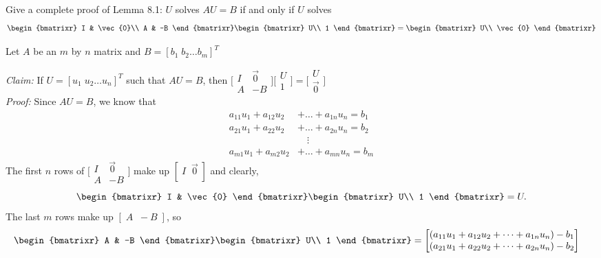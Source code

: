 \documentclass[11pt]{article}
\newcommand{\basiseq}{
\begin{bmatrixr}{2}
    I & \vec{0}\\
    A & -B
  \end{bmatrixr}
  \begin{bmatrixr}{1}
    U\\ 1
  \end{bmatrixr}
  =
  \begin{bmatrixr}{1}
    U\\ \vec{0}
  \end{bmatrixr}
}
\newcommand{\sbasiseq}{
\big[\begin{smallmatrix}
    I & \vec{0}\\
    A & -B
  \end{smallmatrix}\big]
  \big[\begin{smallmatrix}
    U \\ 1
  \end{smallmatrix}\big]
  =\big[
  \begin{smallmatrix}
    U \\ \vec{0}
  \end{smallmatrix}\big]
}
\begin{document}
\begin{prob}{8.1}Give a complete proof of Lemma 8.1: $U$ solves $AU=B$ if and only if $U$ solves
\begin{equation*}\basiseq\end{equation*}
\end{prob}
\begin{sol} Let $A$ be an $m$ by $n$ matrix and $B=[b_1\;b_2\ldots b_m]^T$
  \begin{enumalph}
    \item {\it Claim:} If $U=[u_1\; u_2 \ldots u_n]^T$ such that $AU=B$, then $\sbasiseq$\\
      {\it Proof:} Since $AU=B$, we know that
      \begin{align*}
        a_{11}u_1+a_{12}u_2&+\dots+a_{1n}u_n = b_1\\
        a_{21}u_1+a_{22}u_2&+\dots+a_{2n}u_n = b_2\\
        &\quad\vdots\\
        a_{m1}u_1+a_{m2}u_2&+\dots+a_{mn}u_n = b_m
      \end{align*}
      The first $n$ rows of $\big[\begin{smallmatrix}I & \vec{0}\\A & -B\end{smallmatrix}\big]$ make up $[\;I\;\;\vec{0}\;]$ and clearly,
      \begin{equation*}
        \begin{bmatrixr}{2}
          I & \vec{0}
        \end{bmatrixr}
        \begin{bmatrixr}{1}
          U\\ 1
        \end{bmatrixr}
        = U.
      \end{equation*}
      The last $m$ rows make up $[\;A\;\;-B\;]$, so
      \begin{align*}
        \begin{bmatrixr}{2}
          A & -B
        \end{bmatrixr}
        \begin{bmatrixr}{1}
          U\\ 1
        \end{bmatrixr}
        &=
        \begin{bmatrix}
          (a_{11}u_1+a_{12}u_2+\dots+a_{1n}u_n) - b_1\\
          (a_{21}u_1+a_{22}u_2+\dots+a_{2n}u_n) - b_2\\

\end{bmatrix}
\end{align*}
\end{enumalph}
\end{sol}
\end{document}
